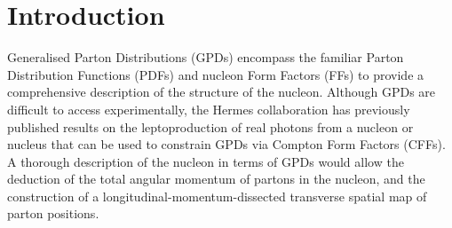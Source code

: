 \section{Introduction}
Generalised Parton Distributions (GPDs)
\cite{Mue94,Ji97a,Rad97} encompass the familiar Parton
Distribution Functions (PDFs) and nucleon Form Factors (FFs) to provide a
comprehensive description of the structure of the nucleon.
Although GPDs are difficult to access experimentally, the H{\sc ermes}
collaboration has previously published results
\cite{Air01,Air06,Air08,Air09,Air10, Air10a, Air10b, Air11} on
the leptoproduction of real photons from a nucleon or nucleus that can
be used to constrain GPDs via Compton Form Factors (CFFs). A thorough
description of the nucleon in terms of GPDs would allow the deduction
of the total angular momentum of partons in the nucleon, and the
construction of a longitudinal-momentum-dissected transverse spatial map of parton positions.

